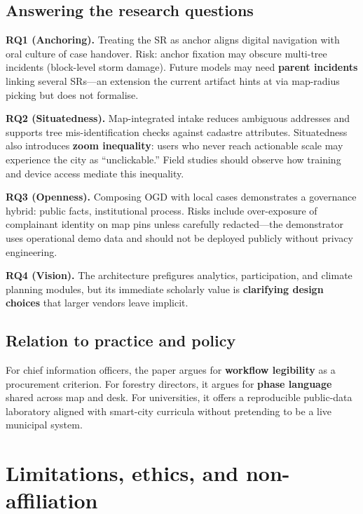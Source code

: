 \documentclass[12pt,a4paper]{article}
\begin{document}
\subsection{Answering the research questions}

\textbf{RQ1 (Anchoring).} Treating the SR as anchor aligns digital navigation with oral culture of case handover. Risk: anchor fixation may obscure multi-tree incidents (block-level storm damage). Future models may need \textbf{parent incidents} linking several SRs---an extension the current artifact hints at via map-radius picking but does not formalise.

\textbf{RQ2 (Situatedness).} Map-integrated intake reduces ambiguous addresses and supports tree mis-identification checks against cadastre attributes. Situatedness also introduces \textbf{zoom inequality}: users who never reach actionable scale may experience the city as ``unclickable.'' Field studies should observe how training and device access mediate this inequality.

\textbf{RQ3 (Openness).} Composing OGD with local cases demonstrates a governance hybrid: public facts, institutional process. Risks include over-exposure of complainant identity on map pins unless carefully redacted---the demonstrator uses operational demo data and should not be deployed publicly without privacy engineering.

\textbf{RQ4 (Vision).} The architecture prefigures analytics, participation, and climate planning modules, but its immediate scholarly value is \textbf{clarifying design choices} that larger vendors leave implicit.

\subsection{Relation to practice and policy}

For chief information officers, the paper argues for \textbf{workflow legibility} as a procurement criterion. For forestry directors, it argues for \textbf{phase language} shared across map and desk. For universities, it offers a reproducible public-data laboratory aligned with smart-city curricula without pretending to be a live municipal system.

\section{Limitations, ethics, and non-affiliation}
\label{sec:limits}
\end{document}
